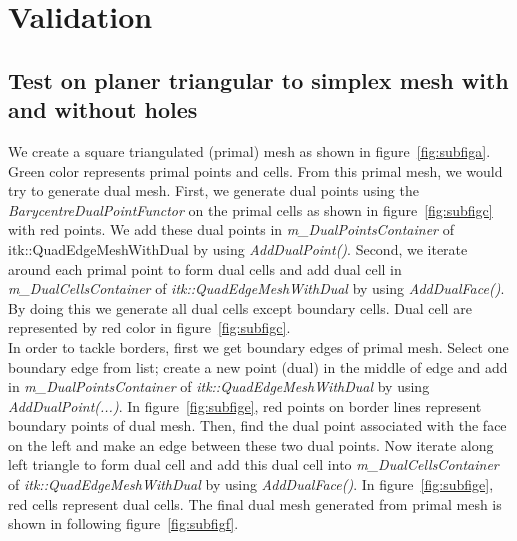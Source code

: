 \documentclass{InsightArticle}
\begin{document}
\section{Validation}
\subsection{Test on planer triangular to simplex mesh with and without holes}
We create a square triangulated (primal) mesh as shown in figure~\ref{fig:subfiga}. Green color represents primal points and cells. From this primal mesh, we would try to generate dual mesh. First, we generate dual points using the \emph{BarycentreDualPointFunctor} on the primal cells as shown in figure~\ref{fig:subfigc} with red points. We add these dual points in \emph{m\_DualPointsContainer} of itk::QuadEdgeMeshWithDual by using \emph{AddDualPoint()}. Second, we iterate around each primal point to form dual cells and add dual cell in \emph{m\_DualCellsContainer} of \emph{itk::QuadEdgeMeshWithDual} by using \emph{AddDualFace()}. By doing this we generate all dual cells except boundary cells. Dual cell are represented by red color in figure~\ref{fig:subfigc}.\\
In order to tackle borders, first we get boundary edges of primal mesh. Select one boundary edge from list; create a new point (dual) in the middle of edge and add in \emph{m\_DualPointsContainer} of \emph{itk::QuadEdgeMeshWithDual} by using \emph{AddDualPoint(...)}.  
In figure~\ref{fig:subfige}, red points on border lines represent boundary points of dual mesh. Then, find the dual point associated with the face on the left and make an edge between these two dual points. Now iterate along left triangle to form dual cell and add this dual cell into \emph{m\_DualCellsContainer} of \emph{itk::QuadEdgeMeshWithDual} by using \emph{AddDualFace()}. In figure~\ref{fig:subfige}, red cells represent dual cells. The final dual mesh generated from primal mesh is shown in following figure~\ref{fig:subfigf}. 
\end{document}
